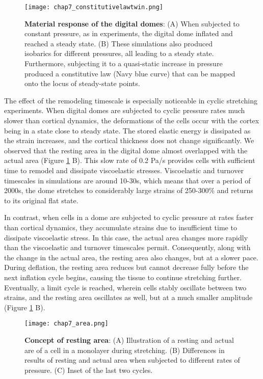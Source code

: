 \begin{figure}[t]
	\centering
	\texttt{[image: chap7\_constitutivelawtwin.png]}
	\caption{\label{fig_7_7} \textbf{Material response of the digital domes}: (A)  When subjected to constant pressure, as in experiments, the digital dome inflated and reached a steady state. (B)  These simulations also produced isobarics for different pressures, all leading to a steady state. Furthermore, subjecting it to a quasi-static increase in pressure produced a constitutive law (Navy blue curve) that can be mapped onto the locus of steady-state points.}
\end{figure}

The effect of the remodeling timescale is especially noticeable in
cyclic stretching experiments. When digital domes are subjected to
cyclic pressure rates much slower than cortical dynamics, the
deformations of the cells occur with the cortex being in a state close
to steady state. The stored elastic energy is dissipated as the strain
increases, and the cortical thickness does not change significantly. We
observed that the resting area in the digital dome almost overlapped
with the actual area (Figure \ref{fig_7_7} B). This
slow rate of 0.2 Pa/s provides cells with sufficient time to remodel and
dissipate viscoelastic stresses. Viscoelastic and turnover timescales in
simulations are around 10-30s, which means that over a period of 2000s,
the dome stretches to considerably large strains of 250-300\% and
returns to its original flat state.

In contrast, when cells in a dome are subjected to cyclic pressure at
rates faster than cortical dynamics, they accumulate strains due to
insufficient time to dissipate viscoelastic stress. In this case, the
actual area changes more rapidly than the viscoelastic and turnover
timescales permit. Consequently, along with the change in the actual
area, the resting area also changes, but at a slower pace. During
deflation, the resting area reduces but cannot decrease fully before the
next inflation cycle begins, causing the tissue to continue stretching
further. Eventually, a limit cycle is reached, wherein cells stably
oscillate between two strains, and the resting area oscillates as well,
but at a much smaller amplitude (Figure \ref{fig_7_7} B).


\begin{figure}
	\centering
	\texttt{[image: chap7\_area.png]}
	\caption{\label{fig_7_8} \textbf{Concept of resting area}: (A) Illustration of a resting and actual are of a cell in a monolayer during stretching. (B) Differences in results of resting and actual area when subjected to different rates of pressure. (C) Inset of the last two cycles.
	}
\end{figure}

